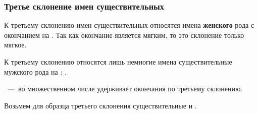 \documentclass[11pt,a4paper,oneside]{memoir}
\begin{document}
                \subsubsection{Третье склонение имен существительных}

    К третьему склонению имен существительных относятся имена \textbf{женского} рода с окончанием на {}. Так как окончание {} является мягким, то это склонение только мягкое.
    
    К третьему склонению относятся лишь немногие имена существительные мужского рода на {}: {}.
    
    {}~---~во множественном числе удерживает окончания по третьему склонению.
    
    Возьмем для образца третьего склонения существительные {} и {}.
    
\end{document}
